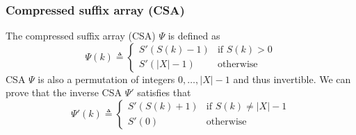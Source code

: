 \documentclass{bioinfo}
\begin{document}
\begin{methods}
\subsubsection{Compressed suffix array (CSA)}
The compressed suffix array (CSA) $\Psi$ is defined as
\begin{equation}\label{eq:Psi}
\Psi(k)\triangleq\left\{\begin{array}{ll}
S'(S(k)-1) & \mbox{if $S(k)>0$}\\
S'(|X|-1) & \mbox{otherwise}
\end{array}\right.
\end{equation}
CSA $\Psi$ is also a permutation of integers $0,\ldots,|X|-1$ and thus invertible.
We can prove that the inverse CSA $\Psi'$ satisfies that
\begin{equation}\label{eq:iPsi}
\Psi'(k)\triangleq\left\{\begin{array}{ll}
S'(S(k)+1) & \mbox{if $S(k)\not=|X|-1$}\\
S'(0) & \mbox{otherwise}
\end{array}\right.
\end{equation}



\end{methods}
\end{document}
